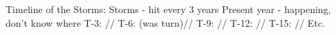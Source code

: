 \documentclass[blue]{GL2020}
\begin{document}


Timeline of the Storms:
Storms - hit every 3 years
Present year - happening, don’t know where
T-3: \pShip{}//
T-6: \pShip{} (was \pTech{} turn)//
T-9: \pFarm{}//
T-12: \pShip{}//
T-15: \pTech{}//
Etc.

\end{document}
